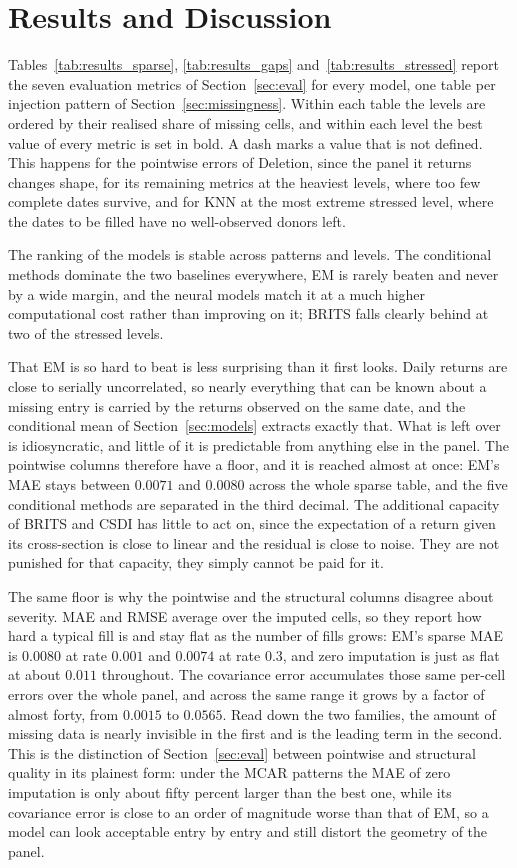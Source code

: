 \chapter{Results and Discussion}
\label{ch:results}

Tables~\ref{tab:results_sparse}, \ref{tab:results_gaps}
and~\ref{tab:results_stressed} report the seven evaluation metrics of
Section~\ref{sec:eval} for every model, one table per injection pattern of
Section~\ref{sec:missingness}. Within each table the levels are ordered by
their realised share of missing cells, and within each level the best value
of every metric is set in bold. A dash marks a value that is not defined.
This happens for the pointwise errors of Deletion, since the panel it
returns changes shape, for its remaining metrics at the heaviest levels,
where too few complete dates survive, and for KNN at the most extreme
stressed level, where the dates to be filled have no well-observed donors
left.

The ranking of the models is stable across patterns and levels. The
conditional methods dominate the two baselines everywhere, EM is rarely
beaten and never by a wide margin, and the neural models match it at a much
higher computational cost rather than improving on it; BRITS falls clearly
behind at two of the stressed levels.

That EM is so hard to beat is less surprising than it first looks. Daily
returns are close to serially uncorrelated, so nearly everything that can be
known about a missing entry is carried by the returns observed on the same
date, and the conditional mean of Section~\ref{sec:models} extracts exactly
that. What is left over is idiosyncratic, and little of it is predictable from
anything else in the panel. The pointwise columns therefore have a floor, and it is reached almost at once:
EM's MAE stays between $0.0071$ and $0.0080$ across the whole sparse table,
and the five conditional methods are separated in the third decimal. The
additional capacity of BRITS and CSDI has little to act on, since the
expectation of a return given its cross-section is close to linear and the
residual is close to noise. They are not punished for that capacity, they
simply cannot be paid for it.

The same floor is why the pointwise and the structural columns disagree about
severity. MAE and RMSE average over the imputed cells, so they report how hard
a typical fill is and stay flat as the number of fills grows: EM's sparse MAE
is $0.0080$ at rate $0.001$ and $0.0074$ at rate $0.3$, and zero imputation is
just as flat at about $0.011$ throughout. The covariance error accumulates
those same per-cell errors over the whole panel, and across the same range it
grows by a factor of almost forty, from $0.0015$ to $0.0565$. Read down the
two families, the amount of missing data is nearly invisible in the first and
is the leading term in the second. This is the distinction of
Section~\ref{sec:eval} between pointwise and structural quality in its
plainest form: under the MCAR patterns the MAE of zero imputation is only
about fifty percent larger than the best one, while its covariance error is
close to an order of magnitude worse than that of EM, so a model can look
acceptable entry by entry and still distort the geometry of the panel.

